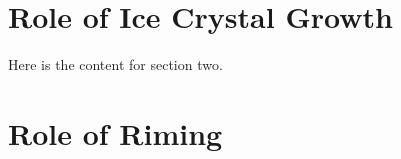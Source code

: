 \section{Role of Ice Crystal Growth}

Here is the content for section two.

\section{Role of Riming}

